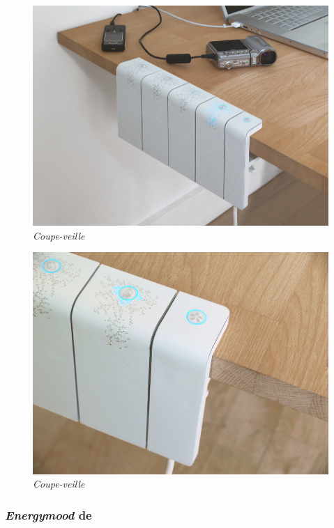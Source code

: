 \documentclass[10pt,a5paper,twoside]{article}
\begin{document}
\begin{figure}
\centering
\includegraphics[]{images/coupeveille-screenshot2.png}
\caption{\emph{Coupe-veille}}\label{fig:coupeveille2}
\end{figure}

\begin{figure}
\centering
\includegraphics[]{images/coupeveille-screenshot3.png}
\caption{\emph{Coupe-veille}}\label{fig:coupeveille3}
\end{figure}

\subsubsection{\emph{Energymood} de
\citet{lejeune2015energymood}}\label{energymood-de-lejeune2015energymood}
\end{document}
